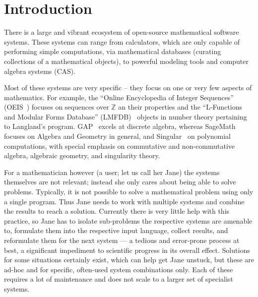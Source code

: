 \section{Introduction}\label{sec:intro}

There is a large and vibrant ecosystem of open-source mathematical software systems. 
These systems can range from calculators, which are only capable of performing simple computations, via mathematical databases (curating collections of a mathematical objects), to powerful modeling tools and computer algebra systems (CAS).

Most of these systems are very specific -- they focus on one or very few aspects of mathematics. 
For example, the ``Online Encyclopedia of Integer Sequences'' (OEIS~\cite{Sloane:oeis12,oeis}) focuses on sequences over $\mathbb{Z}$ an their properties and the ``L-Functions and Modular Forms Database'' (LMFDB)~\cite{Cremona:LMFDB16,lmfdb:on} objects in number theory pertaining to Langland's program. 
GAP~\cite{GAP:on} excels at discrete algebra, whereas SageMath~\cite{SageMath:on} focuses on Algebra and Geometry in general, and Singular~\cite{singular:on} on polynomial computations, with special emphasis on commutative and non-commutative algebra, algebraic geometry, and singularity theory.



For a mathematician however (a user; let us call her Jane) the systems themselves are not relevant; instead she only cares about being able to solve problems. 
Typically, it is not possible to solve a mathematical problem using only a single program. 
Thus Jane needs to work with multiple systems and combine the results to reach a solution. 
Currently there is very little help with this practice, so Jane has to isolate sub-problems the respective systems are amenable to, formulate them into the respective input language, collect results, and reformulate them for the next system --- a tedious and error-prone process at best, a significant impediment to scientific progress in its overall effect. 
Solutions for some situations certainly exist, which can help get Jane unstuck, but these are ad-hoc and for specific, often-used system combinations only. 
Each of these requires a lot of maintenance and does not scale to a larger set of specialist systems. 

